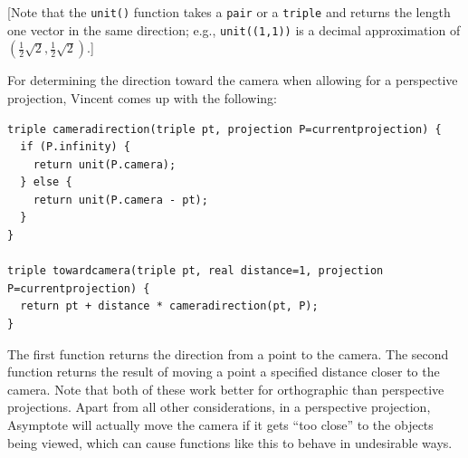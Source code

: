 \documentclass{article}
\begin{document}
[Note that the \texttt{unit()}
function takes a \texttt{pair} or a \texttt{triple} and returns the length one vector
in the same direction; e.g., \texttt{unit((1,1))} is a decimal approximation of
$(\tfrac{1}{2}\sqrt{2}, \tfrac{1}{2}\sqrt{2})$.]

For determining the direction toward the camera when allowing for a perspective projection,
Vincent comes up with the following:
\begin{lstlisting}
triple cameradirection(triple pt, projection P=currentprojection) {
  if (P.infinity) {
    return unit(P.camera);
  } else {
    return unit(P.camera - pt);
  }
}

triple towardcamera(triple pt, real distance=1, projection P=currentprojection) {
  return pt + distance * cameradirection(pt, P);
}
\end{lstlisting}
The first function returns the direction from a point to the camera. The second
function returns the result of moving a point a specified distance closer to
the camera. Note that both of these work better for orthographic than perspective
projections. Apart from all other considerations, in a perspective projection, Asymptote
will actually move the camera if it gets ``too close'' to the objects being viewed,
which can cause functions like this to behave in undesirable ways.
\end{document}
